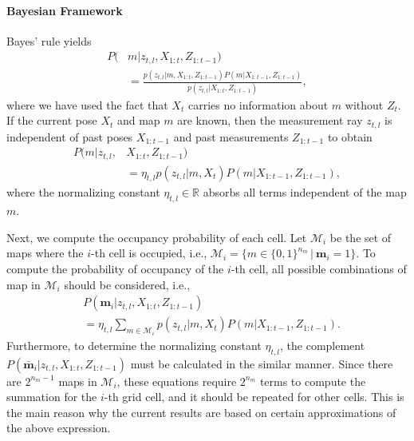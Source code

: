 \documentclass[letterpaper, 10pt, conference]{ieeeconf}
\newcommand{\refeqn}[1]{(\ref{eqn:#1})}
\renewcommand{\Re}{\ensuremath{\mathbb{R}}}
\begin{document}
\paragraph{Bayesian Framework}
Bayes' rule yields
\begin{align}
\label{eqn:BayesRuleRayISM}
P(&m|z_{t,l},X_{1:t},Z_{1:t-1})\nonumber
\\
&=\frac{p(z_{t,l}|m,X_{1:t},Z_{1:t-1})P(m|X_{1:t-1},Z_{1:t-1})}{p(z_{t,l}|X_{1:t},Z_{1:t-1})},
\end{align}
where we have used the fact that $X_t$ carries no information about $m$ without $Z_t$.
If the current pose $X_t$ and map $m$ are known, then the measurement ray $z_{t,l}$ is independent of past poses $X_{1:t-1}$ and past measurements $Z_{1:t-1}$ to obtain
\begin{align}
P(m|z_{t,l},&X_{1:t},Z_{1:t-1})\nonumber
\\
&
=\eta_{t,l}p(z_{t,l}|m,X_{t})P(m|X_{1:t-1},Z_{1:t-1}),
\end{align}
where the normalizing constant $\eta_{t,l}\in\Re$ absorbs all terms independent of the map $m$.


Next, we compute the occupancy probability of each cell. Let $\mathcal{M}_i$ be the set of maps where the $i$-th cell is occupied, i.e., $\mathcal{M}_i =\{m\in\{0,1\}^{{n_m}}\,|\ \mathbf{m}_i=1\}$. To compute the probability of occupancy of the $i$-th cell, all possible combinations of map in $\mathcal{M}_i$ should be considered, i.e., 
\begin{align}
\label{eqn:InvSenModWithProbDens}
&P(\mathbf{m}_i|z_{t,l},X_{1:t},Z_{1:t-1})\nonumber
\\
&=\eta_{t,l}\sum_{m\in\mathcal{M}_i}p(z_{t,l}|m,X_{t})P(m|X_{1:t-1},Z_{1:t-1}).
\end{align}
Furthermore, to determine the normalizing constant $\eta_{t,l}$, the complement $P(\bar{\mathbf{m}}_i|z_{t,l},X_{1:t},Z_{1:t-1})$ must be calculated in the similar manner. Since there are $2^{n_{m}-1}$ maps in $\mathcal{M}_i$, these equations require $2^{n_m}$ terms to compute the summation for the $i$-th grid cell, and it should be repeated for other cells. This is the main reason why the current results are based on certain approximations of the above expression. 
\end{document}

